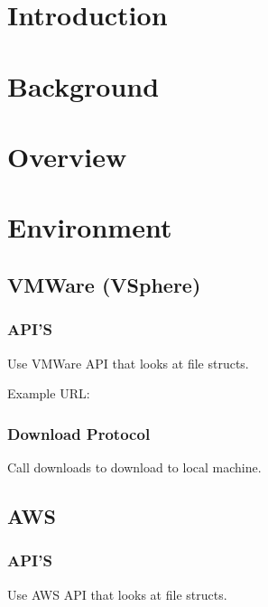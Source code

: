 \documentclass{article}
\title{}
\author{}
\date{}
\begin{document}
    

    \tableofcontents
    \listoffigures

    \newpage
    \begin{versionhistory}
    \end{versionhistory}
    \newpage

    \section{Introduction}
		
    \section{Background}

    \section{Overview}

    \section{Environment}

        \subsection{VMWare (VSphere)}

            \subsubsection{API'S}
            Use VMWare API that looks at file structs.

            Example URL:

            \subsubsection{Download Protocol}
            Call downloads to download to local machine.

        \subsection{AWS}
            \subsubsection{API'S}
            Use AWS API that looks at file structs.
\end{document}
